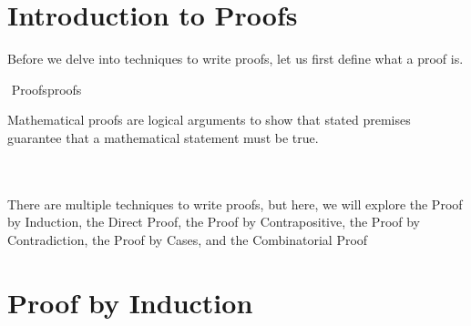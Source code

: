 \section{Introduction to Proofs}
    
    Before we delve into techniques to write proofs, let us first define what a proof is. 
    \begin{definition}{\Stop\,\,Proofs}{proofs}
    
        Mathematical proofs are logical arguments to show that stated premises guarantee that a mathematical statement must be true.
    
    \end{definition}
    \vphantom
    \\
    \\
    There are multiple techniques to write proofs, but here, we will explore the Proof by Induction, the Direct Proof, the Proof by Contrapositive, the Proof by Contradiction, the Proof by Cases, and the Combinatorial Proof
    
\section{Proof by Induction}

